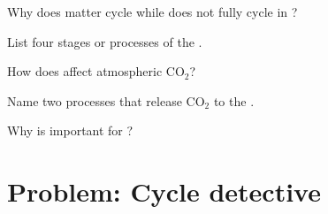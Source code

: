 \begin{exercise}[$\star$]\label{exo:g9:cycles:1}
Why does matter cycle while  does not fully cycle in ?
\end{exercise}

\begin{exercise}[$\star$]\label{exo:g9:cycles:2}
List four stages or processes of the .
\end{exercise}

\begin{exercise}[$\star$]\label{exo:g9:cycles:3}
How does  affect atmospheric $\mathrm{CO_2}$?
\end{exercise}

\begin{exercise}[$\star$]\label{exo:g9:cycles:4}
Name two processes that release $\mathrm{CO_2}$ to the .
\end{exercise}

\begin{exercise}[$\star$]\label{exo:g9:cycles:5}
Why is  important for ?
\end{exercise}

\section{Problem: Cycle detective}

